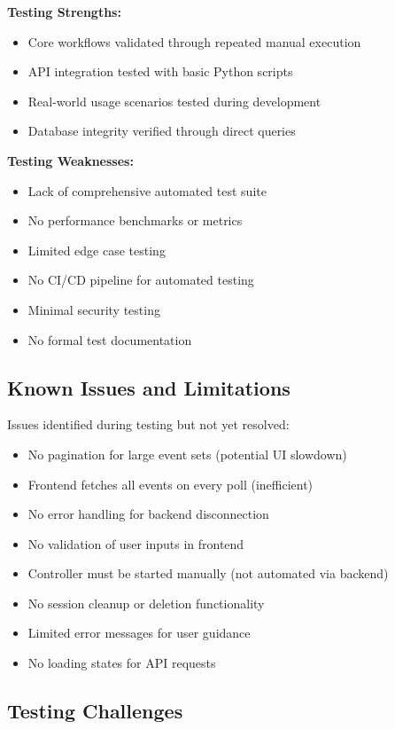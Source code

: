 \begin{itemize}
\textbf{Testing Strengths:}
\begin{itemize}
    \item Core workflows validated through repeated manual execution
    \item API integration tested with basic Python scripts
    \item Real-world usage scenarios tested during development
    \item Database integrity verified through direct queries
\end{itemize}

\textbf{Testing Weaknesses:}
\begin{itemize}
    \item Lack of comprehensive automated test suite
    \item No performance benchmarks or metrics
    \item Limited edge case testing
    \item No CI/CD pipeline for automated testing
    \item Minimal security testing
    \item No formal test documentation
\end{itemize}

\subsection{Known Issues and Limitations}

Issues identified during testing but not yet resolved:

\begin{itemize}
    \item No pagination for large event sets (potential UI slowdown)
    \item Frontend fetches all events on every poll (inefficient)
    \item No error handling for backend disconnection
    \item No validation of user inputs in frontend
    \item Controller must be started manually (not automated via backend)
    \item No session cleanup or deletion functionality
    \item Limited error messages for user guidance
    \item No loading states for API requests
\end{itemize}

\subsection{Testing Challenges}


\end{itemize}

